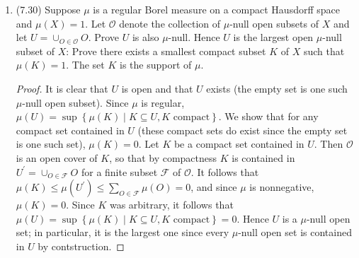 \documentclass[11pt]{article}
\newcommand{\cbr}[1]{\left\{#1\right\}}
\begin{document}
\begin{enumerate}
    \item (7.30) Suppose $\mu$ is a regular Borel measure on a compact Hausdorff space and
    $\mu(X) = 1$. Let $\mathcal{O}$ denote the collection of $\mu$-null open subsets of $X$ and let $U = \cup_{O\in \mathcal{O}} O$.
    Prove $U$ is also $\mu$-null. Hence $U$ is the largest open $\mu$-null subset of $X$: Prove there exists a smallest compact subset $K$ of $X$ such that $\mu(K) = 1$. The set $K$ is the support of $\mu$. \begin{proof}
        It is clear that $U$ is open and that $U$ exists (the empty set is one such $\mu$-null open subset). Since $\mu$ is regular, $\mu(U) = \sup\cbr{\mu(K)\mid K\subseteq U, K \text{ compact}}$. We show that for any compact set contained in $U$ (these compact sets do exist since the empty set is one such set), $\mu(K) = 0$. Let $K$ be a compact set contained in $U$. Then $\mathcal{O}$ is an open cover of $K$, so that by compactness $K$ is contained in $U^\prime = \cup_{O\in \mathcal{F}}O$ for a finite subset $\mathcal{F}$ of $\mathcal{O}$. It follows that $\mu(K) \leq \mu(U^\prime) \leq \sum_{O\in\mathcal{F}} \mu(O) = 0$, and since $\mu$ is nonnegative, $\mu(K) = 0$. Since $K$ was arbitrary, it follows that $\mu(U) = \sup\cbr{\mu(K)\mid K\subseteq U, K \text{ compact}} = 0$. Hence $U$ is a $\mu$-null open set; in particular, it is the largest one since every $\mu$-null open set is contained in $U$ by contstruction.


\end{proof}
\end{enumerate}
\end{document}
